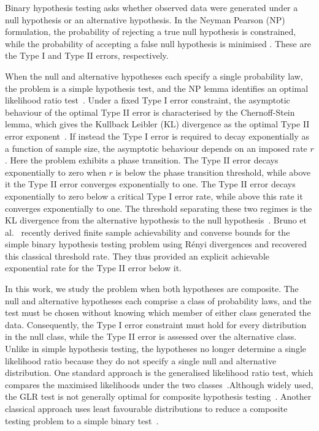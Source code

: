 \documentclass[journal,10pt,draftclsnofoot,onecolumn]{IEEEtran}
\begin{document}
Binary hypothesis testing asks whether observed data were generated under a null hypothesis or an alternative hypothesis. In the Neyman Pearson (NP) formulation, the probability of rejecting a true null hypothesis is constrained, while the probability of accepting a false null hypothesis is minimised \cite{neyman1933testing,lehmann2005testing}. These are the Type I and Type II errors, respectively.

When the null and alternative hypotheses each specify a single probability law, the problem is a simple hypothesis test, and the NP lemma identifies an optimal likelihood ratio test~\cite{neyman1933testing}. Under a fixed Type I error constraint, the asymptotic behaviour of the optimal Type II error is characterised by the Chernoff-Stein lemma, which gives the Kullback Leibler (KL) divergence as the optimal Type II error exponent~\cite{cover2006elements}. If instead the Type I error is required to decay exponentially as a function of sample size, the asymptotic behaviour depends on an imposed rate $r$. Here the problem exhibits a phase transition. The Type II error decays exponentially to zero when $r$ is below the phase transition threshold, while above it the Type II error converges exponentially to one. The Type II error decays exponentially to zero below a critical Type I error rate, while above this rate it converges exponentially to one. The threshold separating these two regimes is the KL divergence from the alternative hypothesis to the null hypothesis~\cite{blahut1974hypothesis,han2002strong}. Bruno et al.~\cite{bruno2026finite} recently derived finite sample achievability and converse bounds for the simple binary hypothesis testing problem using R\'enyi divergences and recovered this classical threshold rate. They thus provided an explicit achievable exponential rate for the Type II error below it.

In this work, we study the problem when both hypotheses are composite. The null and alternative hypotheses each comprise a class of probability laws, and the test must be chosen without knowing which member of either class generated the data. Consequently, the Type I error constraint must hold for every distribution in the null class, while the Type II error is assessed over the alternative class. Unlike in simple hypothesis testing, the hypotheses no longer determine a single likelihood ratio because they do not specify a single null and alternative distribution. One standard approach is the generalised likelihood ratio test, which compares the maximised likelihoods under the two classes~\cite{zeitouni1992generalized}.Although widely used, the GLR test is not generally optimal for composite hypothesis testing~\cite{zeitouni1992generalized}. Another classical approach uses least favourable distributions to reduce a composite testing problem to a simple binary test~\cite{fauss2021minimax}.
\end{document}
